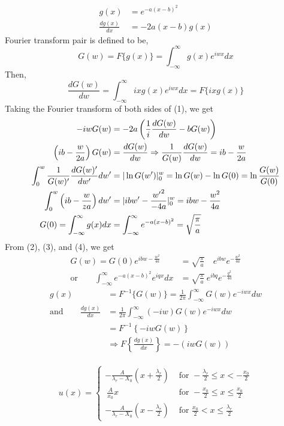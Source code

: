 \documentclass[letterpage]{article}
\begin{document}
\begin{align}
  g(x)&=e^{-a(x-b)^2}\\
  \frac{dg(x)}{dx}& = -2a(x-b)g(x)
\end{align}
Fourier transform pair is defined to be,
\begin{equation}
  G(w) = F\{g(x)\} = \int_{-\infty}^\infty g(x)e^{iwx}dx
\end{equation}
Then,
\begin{equation}
  \frac{dG(w)}{dw} = \int_{-\infty}^\infty ixg(x)e^{iwx}dx = F\{ixg(x)\}
\end{equation}
Taking the Fourier transform of both sides of (1), we get
\begin{align}
  -iwG(w) &= -2a \left(\frac{1}{i} \frac{dG(w)}{dw} - bG(w)\right)\\
  \left(ib-\frac{w}{2a}\right) G(w) &= \frac{dG(w)}{dw} \Rightarrow
  \frac{1}{G(w)} \frac{dG(w)}{dw} = ib-\frac{w}{2a}\\
  \int_0^w \frac{1}{G(w)'} \frac{dG(w)'}{dw'} dw' &= 
  \arrowvert\ln G(w')\arrowvert_0^w = \ln G(w) - \ln G(0) 
  = \ln \frac{G(w)}{G(0)}\\
  \int_0^w \left(ib-\frac{w}{za}\right)dw' &= \arrowvert ibw' - \frac{{w'}^2}{-4a}
  \arrowvert_0^w = ibw-\frac{w^2}{4a}\\
  G(0) = \int_{-\infty}^\infty g(x) dx &= \int_{-\infty}^\infty e^{-a(x-b)^2}
  = \sqrt{\frac{\pi}{a}}
\end{align}
From (2), (3), and (4), we get
\begin{align}
  G(w) = G(0) e^{ibw-\frac{w^2}{4a}} &= \sqrt{\frac{\pi}{a}} \quad e^{ibw} 
  e^{-\frac{w^2}{4a}}\\
  \text{or} \qquad
  \int_{-\infty}^\infty e^{-a(x-b)^2} e^{iqx}dx &= \sqrt{\frac{\pi}{a}}
  \: e^{ibq} e^{-\frac{q^2}{4a}}
\end{align}
\begin{align}
  g(x) &= F^{-1} \{G(w)\} = \frac{1}{2\pi} \int_{-\infty}^\infty 
  G(w)e^{-iwx}dw\\
  \text{and} \qquad \frac{dg(x)}{dx} &= \frac{1}{2\pi} \int_{-\infty}^\infty
  (-iw)G(w)e^{-iwx}dw\\
  &=F^{-1} \left\{-iwG(w)\right\}\\
  &\Rightarrow F\left\{\frac{dg(x)}{dx} \right\} = -(iwG(w))
\end{align}
\\
\begin{equation*}
  u(x) = 
    \begin{cases}
    -\frac{A}{\lambda_r - X_0} \left(x+\frac{\lambda_r}{2}\right) 
     &\text{ for } 
    -\frac{\lambda_r}{2} \leq x < -\frac{x_0}{2}\\
    \: \frac{A}{x_0}x &\text{ for } 
    -\frac{x_0}{2} \leq x \leq \frac{x_0}{2}\\
    -\frac{A}{\lambda_r-X_0} \left(x-\frac{\lambda_r}{2}\right)
    &\text{ for } 
   \frac{x_0}{2} < x \leq \frac{\lambda_r}{2}
    \end{cases}
\end{equation*}
\end{document}
